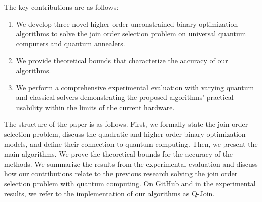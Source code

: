 The key contributions are as follows:
\begin{enumerate}
    \item We develop three novel higher-order unconstrained binary optimization algorithms to solve the join order selection problem on universal quantum computers and quantum annealers.
    \item We provide theoretical bounds that characterize the accuracy of our algorithms.
    \item We perform a comprehensive experimental evaluation with varying quantum and classical solvers demonstrating the proposed algorithms' practical usability within the limits of the current hardware.
\end{enumerate}

The structure of the paper is as follows. First, we formally state the join order selection problem, discuss the quadratic and higher-order binary optimization models, and define their connection to quantum computing. Then, we present the main algorithms. We prove the theoretical bounds for the accuracy of the methods. We summarize the results from the experimental evaluation and discuss how our contributions relate to the previous research solving the join order selection problem with quantum computing. On GitHub \cite{anonymous2024qjoin} and in the experimental results, we refer to the implementation of our algorithms as Q-Join.